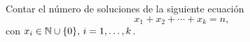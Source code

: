 \begin{statement}{5}
  Contar el n\'umero de soluciones de la siguiente ecuaci\'on
  \[
    x_1 + x_2 + \cdots + x_k = n,  
  \]
  con $x_i \in \mathbb N \cup \{0\},\, i = 1, \dots, k$.
\end{statement}